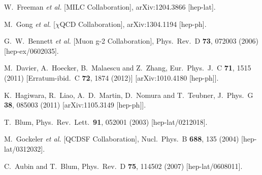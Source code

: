 \begin{thebibliography}{99}
  W.~Freeman {\it et al.}  [MILC Collaboration],
  arXiv:1204.3866 [hep-lat].

  M.~Gong {\it et al.} [$\chi$QCD Collaboration],
  arXiv:1304.1194 [hep-ph].

  G.~W.~Bennett {\it et al.}  [Muon g-2 Collaboration],
  Phys.\ Rev.\ D {\bf 73}, 072003 (2006)
  [hep-ex/0602035].

  M.~Davier, A.~Hoecker, B.~Malaescu and Z.~Zhang,
  Eur.\ Phys.\ J.\ C {\bf 71}, 1515 (2011)
  [Erratum-ibid.\ C {\bf 72}, 1874 (2012)]
  [arXiv:1010.4180 [hep-ph]].

  K.~Hagiwara, R.~Liao, A.~D.~Martin, D.~Nomura and T.~Teubner,
  J.\ Phys.\ G {\bf 38}, 085003 (2011)
  [arXiv:1105.3149 [hep-ph]].

  T.~Blum,
  Phys.\ Rev.\ Lett.\  {\bf 91}, 052001 (2003)
  [hep-lat/0212018].

  M.~Gockeler {\it et al.}  [QCDSF Collaboration],
  Nucl.\ Phys.\ B {\bf 688}, 135 (2004)
  [hep-lat/0312032].

  C.~Aubin and T.~Blum,
  Phys.\ Rev.\ D {\bf 75}, 114502 (2007)
  [hep-lat/0608011].


\end{thebibliography}
